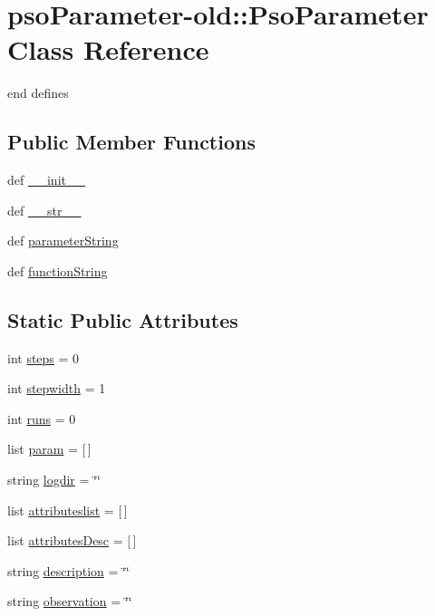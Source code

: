 \hypertarget{classpsoParameter-old_1_1PsoParameter}{
\section{psoParameter-old::PsoParameter Class Reference}
\label{classpsoParameter-old_1_1PsoParameter}
}
end defines  


\subsection*{Public Member Functions}
\begin{CompactItemize}
\item 
def \hyperlink{classpsoParameter-old_1_1PsoParameter_c125e5705b61324ba3d2b29014251333}{\_\-\_\-init\_\-\_\-}
\item 
def \hyperlink{classpsoParameter-old_1_1PsoParameter_4369aff0c3c6bf1981b0b35f69592097}{\_\-\_\-str\_\-\_\-}
\item 
def \hyperlink{classpsoParameter-old_1_1PsoParameter_26b87936eff6693f2b8e207ed0990ffc}{parameterString}
\item 
def \hyperlink{classpsoParameter-old_1_1PsoParameter_c764ad674dddf116f274c83caf0f261e}{functionString}
\end{CompactItemize}
\subsection*{Static Public Attributes}
\begin{CompactItemize}
\item 
int \hyperlink{classpsoParameter-old_1_1PsoParameter_2a963106246f1ee7282300c01cabe96f}{steps} = 0
\item 
int \hyperlink{classpsoParameter-old_1_1PsoParameter_cbcccf01267ef6a3e61116080360a517}{stepwidth} = 1
\item 
int \hyperlink{classpsoParameter-old_1_1PsoParameter_df98537e2d241d4b2b63aac0adbf702d}{runs} = 0
\item 
list \hyperlink{classpsoParameter-old_1_1PsoParameter_48e6d2fd1fc8dcd300b506372069ee9a}{param} = \mbox{[}$\,$\mbox{]}
\item 
string \hyperlink{classpsoParameter-old_1_1PsoParameter_c687e68c739844ffd0219f457b6848b0}{logdir} = \char`\"{}\char`\"{}
\item 
list \hyperlink{classpsoParameter-old_1_1PsoParameter_def2424034414cea856cc5d17947b0a4}{attributeslist} = \mbox{[}$\,$\mbox{]}
\item 
list \hyperlink{classpsoParameter-old_1_1PsoParameter_3b713407c5f7f3d8096d1f62f4f4edf7}{attributesDesc} = \mbox{[}$\,$\mbox{]}
\item 
string \hyperlink{classpsoParameter-old_1_1PsoParameter_029921a2843344aa1b6ff92b5e8801e0}{description} = \char`\"{}\char`\"{}
\item 
string \hyperlink{classpsoParameter-old_1_1PsoParameter_183b70f191f660001b38d24b7016b9df}{observation} = \char`\"{}\char`\"{}
\end{CompactItemize}


